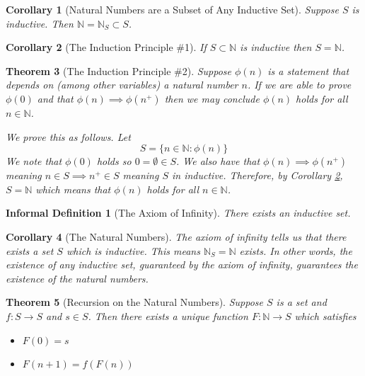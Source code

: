 \documentclass[12pt]{article}
\theoremstyle{break}
\theoremstyle{break}
\newtheorem{theorem}{Theorem}[section]
\theoremstyle{break}
\newtheorem{corollary}[theorem]{Corollary}
\theoremstyle{break}
\theoremstyle{break}
\newtheorem{informal definition}[definition]{Informal Definition}
\begin{document}
\begin{corollary}[Natural Numbers are a Subset of Any Inductive Set]
Suppose $S$ is inductive. Then $\mathbb{N} = \mathbb{N}_S \subset S$.
\end{corollary}

\begin{corollary}[The Induction Principle \#1]
\label{corr:inform:inductprinc1}
If $S\subset \mathbb{N}$ is inductive then $S = \mathbb{N}$.
\end{corollary}

\begin{theorem}[The Induction Principle \#2]
Suppose $\phi(n)$ is a statement that depends on (among other variables) a natural number $n$.
If we are able to prove $\phi(0)$ and that $\phi(n) \implies \phi(n^+)$ then we may conclude $\phi(n)$ holds for all $n\in \mathbb{N}$.

We prove this as follows.
Let
$$
S = \{n\in\mathbb{N}: \phi(n)\}
$$
We note that $\phi(0)$ holds so $0=\emptyset \in S$.
We also have that $\phi(n) \implies \phi(n^+)$ meaning $n\in S \implies n^+\in S$ meaning $S$ in inductive.
Therefore, by Corollary \ref{corr:inform:inductprinc1}, $S = \mathbb{N}$ which means that $\phi(n)$ holds for all $n\in \mathbb{N}$.
\end{theorem}

\begin{informal definition}[The Axiom of Infinity]
\label{infdef:axiominf}
There exists an inductive set.
\end{informal definition}

\begin{corollary}[The Natural Numbers]
The axiom of infinity tells us that there exists a set $S$ which is inductive.
This means $\mathbb{N}_S = \mathbb{N}$ exists.
In other words, the existence of any inductive set, guaranteed by the axiom of infinity, guarantees the existence of the natural numbers.
\end{corollary}

\begin{theorem}[Recursion on the Natural Numbers]
Suppose $S$ is a set and $f:S \to S$ and $s\in S$.
Then there exists a unique function $F:\mathbb{N}\to S$ which satisfies
\begin{itemize}
\item{$F(0) = s$}
\item{$F(n+1) = f(F(n))$}
\end{itemize}



\end{theorem}
\end{document}
